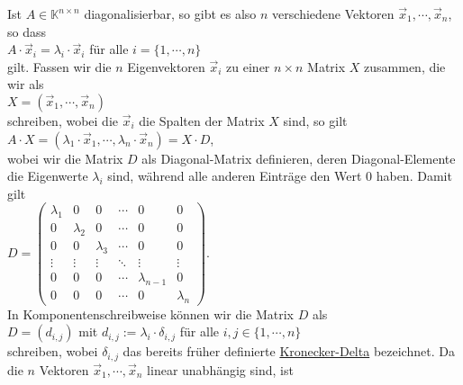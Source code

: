 \remark
Ist  $A \in \mathbb{K}^{n \times n}$ diagonalisierbar, so gibt es also $n$ verschiedene Vektoren
$\vec{x}_1, \cdots, \vec{x}_n$, so dass
\\[0.2cm]
\hspace*{1.3cm}
$A \cdot \vec{x}_i = \lambda_i \cdot \vec{x}_i$ \quad f\"ur alle $i=\{1,\cdots,n\}$
\\[0.2cm]
gilt. Fassen wir die $n$ Eigenvektoren $\vec{x}_i$ zu einer $n \times n$ Matrix $X$ zusammen, die
wir als
\\[0.2cm]
\hspace*{1.3cm}
$X = (\vec{x}_1, \cdots, \vec{x}_n)$
\\[0.2cm]
schreiben, wobei die $\vec{x}_i$ die Spalten der Matrix $X$ sind, so gilt
\\[0.2cm]
\hspace*{1.3cm}
$A \cdot X = (\lambda_1 \cdot \vec{x}_1, \cdots, \lambda_n \cdot \vec{x}_n) = X \cdot D$,
\\[0.2cm]
wobei wir die Matrix $D$ als Diagonal-Matrix definieren, deren Diagonal-Elemente die Eigenwerte
$\lambda_i$ sind, w\"ahrend alle anderen Eintr\"age den Wert $0$ haben.  Damit gilt 
\\[0.2cm]
\hspace*{1.3cm}
$D = \left(
  \begin{array}{llllll}
    \lambda_1 & 0         & 0         & \cdots & 0 & 0 \\ 
    0         & \lambda_2 & 0         & \cdots & 0 & 0 \\
    0         & 0         & \lambda_3 & \cdots & 0 & 0 \\
    \vdots    & \vdots    & \vdots    & \ddots & \vdots & \vdots \\
    0         & 0         & 0         & \cdots  & \lambda_{n-1} & 0 \\
    0         & 0         & 0         & \cdots & 0 & \lambda_n 
  \end{array}
\right)
$.
\\[0.2cm]
In Komponentenschreibweise k\"onnen wir die Matrix $D$ als
\\[0.2cm]
\hspace*{1.3cm}
$D = (d_{i,j})$ \quad mit $d_{i,j} := \lambda_i \cdot \delta_{i,j}$ \quad f\"ur alle $i,j\in \{1,\cdots,n\}$
\\[0.2cm]
schreiben, wobei $\delta_{i,j}$ das bereits fr\"uher definierte
\href{http://de.wikipedia.org/wiki/Kronecker-Delta}{Kronecker-Delta} bezeichnet.  Da die $n$
Vektoren $\vec{ x}_1, \cdots, \vec{x}_n$ linear unabh\"angig sind, ist 
